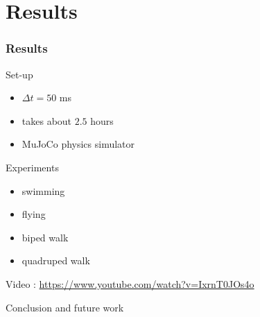 \documentclass[mathserif]{beamer}
\begin{document}


\section{Results}

\begin{frame}
  \frametitle{{Results}}
  \begin{block}{Set-up}
  \begin{itemize}
 	\item $\Delta t = 50$ ms
 	\item takes about $2.5$ hours
 	\item MuJoCo physics simulator 
  \end{itemize}
  \end{block}
  
  \begin{block}{Experiments}
  \begin{itemize}
 	\item swimming
 	\item flying
 	\item biped walk
 	\item quadruped walk
  \end{itemize}
 Video : \url{https://www.youtube.com/watch?v=IxrnT0JOs4o}
  \end{block}

\end{frame}



\begin{frame}
 \begin{center}
 \begin{Huge}
Conclusion and future work
\end{Huge}
 \end{center}

\end{frame}






\end{document}
